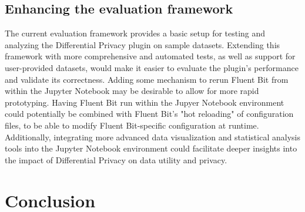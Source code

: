 \subsection{Enhancing the evaluation framework}
The current evaluation framework provides a basic setup for testing and analyzing the Differential Privacy plugin on sample datasets. Extending this framework with more comprehensive and automated tests, as well as support for user-provided datasets, would make it easier to evaluate the plugin's performance and validate its correctness. Adding some mechanism to rerun Fluent Bit from within the Jupyter Notebook may be desirable to allow for more rapid prototyping. Having Fluent Bit run within the Jupyer Notebook environment could potentially be combined with Fluent Bit's "hot reloading" of configuration files, to be able to modify Fluent Bit-specific configuration at runtime. Additionally, integrating more advanced data visualization and statistical analysis tools into the Jupyter Notebook environment could facilitate deeper insights into the impact of Differential Privacy on data utility and privacy. 

\section{Conclusion}
